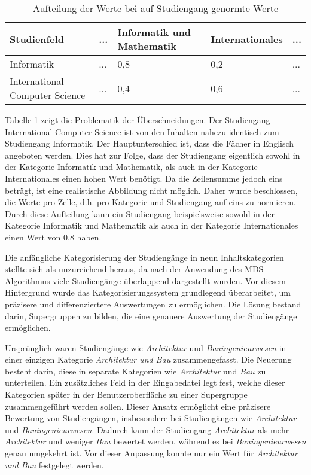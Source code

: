 \begin{table}[!ht]
    \centering
    \begin{tabular}{|l|l|l|l|l|}
    \hline
    \textbf{Studienfeld}           & \textbf{...} & \textbf{Informatik und Mathematik} & \textbf{Internationales} & \textbf{...} \\ \hline
    Informatik                     & ...          & 0,8                                & 0,2                      & ...          \\ \hline
    International Computer Science & ...          & 0,4                                & 0,6                      & ...          \\ \hline
    \end{tabular}

    \caption{Aufteilung der Werte bei auf Studiengang genormte Werte}
    \label{table:norm-values}
\end{table}

Tabelle \ref{table:norm-values} zeigt die Problematik der Überschneidungen. Der Studiengang International Computer Science ist von den Inhalten nahezu identisch zum Studiengang Informatik. Der Hauptunterschied ist, dass die Fächer in Englisch angeboten werden. Dies hat zur Folge, dass der Studiengang eigentlich sowohl in der Kategorie Informatik und Mathematik, als auch in der Kategorie Internationales einen hohen Wert benötigt. Da die Zeilensumme jedoch eins beträgt, ist eine realistische Abbildung nicht möglich. Daher wurde beschlossen, die Werte pro Zelle, d.h. pro Kategorie und Studiengang auf eins zu normieren. Durch diese Aufteilung kann ein Studiengang beispielsweise sowohl in der Kategorie Informatik und Mathematik als auch in der Kategorie Internationales einen Wert von 0,8 haben.

Die anfängliche Kategorisierung der Studiengänge in neun Inhaltskategorien stellte sich als unzureichend heraus, da nach der Anwendung des MDS-Algorithmus viele Studiengänge überlappend dargestellt wurden. Vor diesem Hintergrund wurde das Kategorisierungssystem grundlegend überarbeitet, um präzisere und differenziertere Auswertungen zu ermöglichen. Die Lösung bestand darin, Supergruppen zu bilden, die eine genauere Auswertung der Studiengänge ermöglichen.

Ursprünglich waren Studiengänge wie \textit{Architektur} und \textit{Bauingenieurwesen} in einer einzigen Kategorie \textit{Architektur und Bau} zusammengefasst. Die Neuerung besteht darin, diese in separate Kategorien wie \textit{Architektur} und \textit{Bau} zu unterteilen. Ein zusätzliches Feld in der Eingabedatei legt fest, welche dieser Kategorien später in der Benutzeroberfläche zu einer Supergruppe zusammengeführt werden sollen. Dieser Ansatz ermöglicht eine präzisere Bewertung von Studiengängen, insbesondere bei Studiengängen wie \textit{Architektur} und \textit{Bauingenieurwesen}. Dadurch kann der Studiengang \textit{Architektur} als mehr \textit{Architektur} und weniger \textit{Bau} bewertet werden, während es bei \textit{Bauingenieurwesen} genau umgekehrt ist. Vor dieser Anpassung konnte nur ein Wert für \textit{Architektur und Bau} festgelegt werden.

